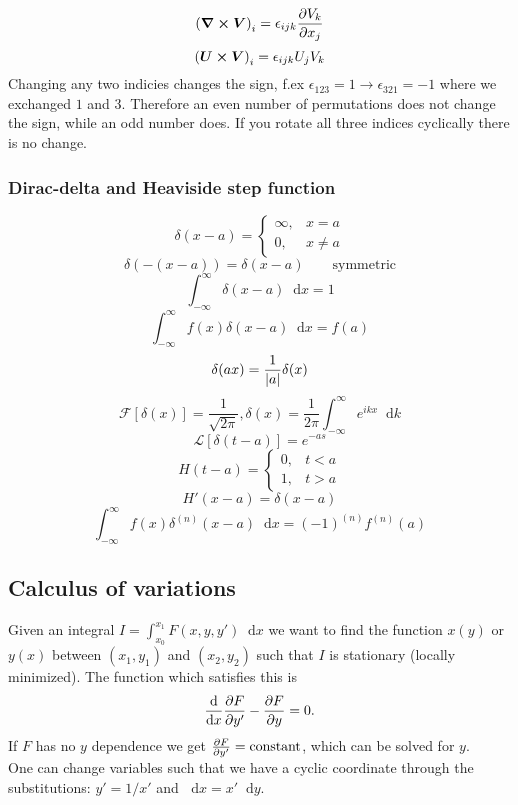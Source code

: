\documentclass[a4paper, 10pt]{article}
\newcommand*\diff{\mathop{}\!\mathrm{d}}
\begin{document}
\begin{multicols*}{3}
$$ \left( \bm{\nabla} \cross \bm{V}\right)_i = \epsilon_{ijk}\pdv{V_k}{x_j}$$
$$ \left( \bm{U} \cross \bm{V}\right)_i = \epsilon_{ijk}U_jV_k$$
Changing any two indicies changes the sign, f.ex $\epsilon_{123}=1\rightarrow\epsilon_{321}=-1$ where we exchanged $1$ and $3$. Therefore an even number of permutations does not change the sign, while an odd number does. If you rotate all three indices cyclically there is no change.
\subsubsection*{Dirac-delta and Heaviside step function}
\[
\delta(x-a)=\begin{cases}
\infty, & x=a \\
0, &  x\neq a
\end{cases}\]
$$ \delta(-(x-a)) = \delta(x-a) \qquad \text{symmetric}$$
$$ \int_{-\infty}^{\infty} \delta(x-a) \diff x = 1$$
$$ \int_{-\infty}^{\infty} f(x) \delta(x-a) \diff x = f(a)$$
$$ \delta(ax) = \frac{1}{\abs{a}}\delta(x)$$
$$ \mathcal{F}\left[ \delta(x) \right] = \frac{1}{\sqrt{2\pi}}, \delta(x) = \frac{1}{2\pi}\int_{-\infty}^{\infty}e^{ikx}\diff k$$
$$ \mathcal{L}\left[ \delta(t-a) \right] = e^{-as}$$
\[
H(t-a)=\begin{cases}
0, & t<a\\
1, & t>a
\end{cases}\]
$$ H'(x-a) = \delta(x-a) $$
$$ \int_{-\infty}^{\infty} f(x) \delta^{(n)}(x-a) \diff x = (-1)^{(n)}f^{(n)}(a)$$



\begin{mdframed}
\subsection*{Calculus of variations}
\end{mdframed}
Given an integral $I=\int_{x_0}^{x_1} F(x, y, y') \diff x$ we want to find the function $x(y)$ or $y(x)$ between $(x_1, y_1)$ and $(x_2, y_2)$ such that $I$ is stationary (locally minimized). The function which satisfies this is
$$ \dv{}{x}\pdv{F}{y'} - \pdv{F}{y} = 0.$$
If $F$ has no $y$ dependence we get $\pdv{F}{y'}=\text{constant}$, which can be solved for $y$. \\
One can change variables such that we have a cyclic coordinate through the substitutions: $y' = 1/x'$ and $\diff x = x' \diff y$.
\begin{mdframed}

\end{mdframed}
\end{multicols*}
\end{document}
